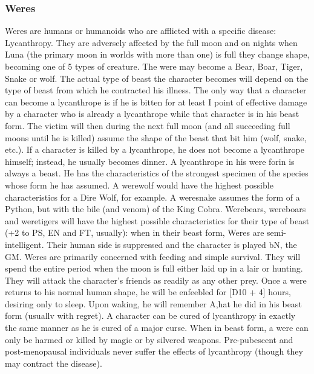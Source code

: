 \begin{multicols}{2}
\begin{description}
\end{description}

\subsubsection{Weres}

\begin{description}
\setlength\itemsep{0pt}

\item[Comments] Weres are humans or humanoids who are afflicted with a
specific disease: Lycanthropy. They are adversely affected by the full
moon and on nights when Luna (the primary moon in worlds with more
than one) is full they change shape, becoming one of 5 types of
creature. The were may become a Bear, Boar, Tiger, Snake or wolf. The
actual type of beast the character becomes will depend on the type of
beast from which he contracted his illness. The only way that a
character can become a lycanthrope is if he is bitten for at least I
point of effective damage by a character who is already a lycanthrope
while that character is in his beast form. The victim will then during
the next full moon (and all succeeding full moons until he is killed)
assume the shape of the beast that bit him (wolf, snake, etc.). If a
character is killed by a lycanthrope, he does not become a lycanthrope
himself; instead, he usually becomes dinner.  A lycanthrope in his
were forin is always a beast. He has the characteristics of the
strongest specimen of the species whose form he has assumed. A
werewolf would have the highest possible characteristics for a Dire
Wolf, for example. A weresnake assumes the form of a Python, but with
the bile (and venom) of the King Cobra. Werebears, wereboars and
weretigers will have the highest possible characteristics for their
type of beast (+2 to PS, EN and FT, usually): when in their beast
form, Weres are semi-intelligent. Their human side is suppressed and
the character is played bN, the GM. Weres are primarily concerned
with feeding and simple survival. They will spend the entire period
when the moon is full either laid up in a lair or hunting. They will
attack the character's friends as readily as any other prey.  Once a
were returns to his normal human shape, he will be enfeebled for [D10 +
4] hours, desiring only to sleep. Upon waking, he will remember A,hat
he did in his beast form (usuallv with regret).  A character can be
cured of lycanthropy in exactly the same manner as he is cured of a
major curse.  When in beast form, a were can only be harmed or killed
by magic or by silvered weapons.  Pre-pubescent and post-menopausal
individuals never suffer the effects of lycanthropy (though they may
contract the disease).

\end{description}
\end{multicols}
